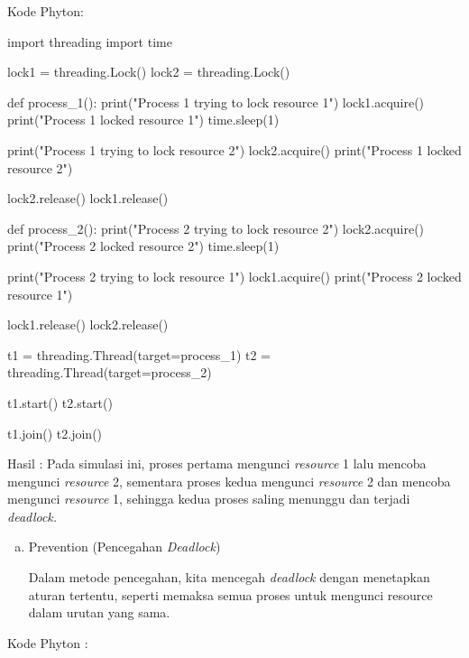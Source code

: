 \documentclass[12pt]{article}
\begin{document}
Kode Phyton:

\begin{python}
import threading
import time

lock1 = threading.Lock()
lock2 = threading.Lock()

def process_1():
    print("Process 1 trying to lock resource 1")
    lock1.acquire()
    print("Process 1 locked resource 1")
    time.sleep(1)
    
    print("Process 1 trying to lock resource 2")
    lock2.acquire()
    print("Process 1 locked resource 2")
    
    lock2.release()
    lock1.release()

def process_2():
    print("Process 2 trying to lock resource 2")
    lock2.acquire()
    print("Process 2 locked resource 2")
    time.sleep(1)
    
    print("Process 2 trying to lock resource 1")
    lock1.acquire()
    print("Process 2 locked resource 1")
    
    lock1.release()
    lock2.release()

t1 = threading.Thread(target=process_1)
t2 = threading.Thread(target=process_2)

t1.start()
t2.start()

t1.join()
t2.join()

\end{python}

    Hasil : Pada simulasi ini, proses pertama mengunci \textit{resource} 1 lalu mencoba mengunci \textit{resource} 2, sementara proses kedua mengunci \textit{resource} 2 dan mencoba mengunci \textit{resource} 1, sehingga kedua proses saling menunggu dan terjadi \textit{deadlock.}


\begin{enumerate}[a.]
    \item Prevention (Pencegahan \textit{Deadlock})

    Dalam metode pencegahan, kita mencegah \textit{deadlock} dengan menetapkan aturan tertentu, seperti memaksa semua proses untuk mengunci resource dalam urutan yang sama.
\end{enumerate}

Kode Phyton :
\end{document}
